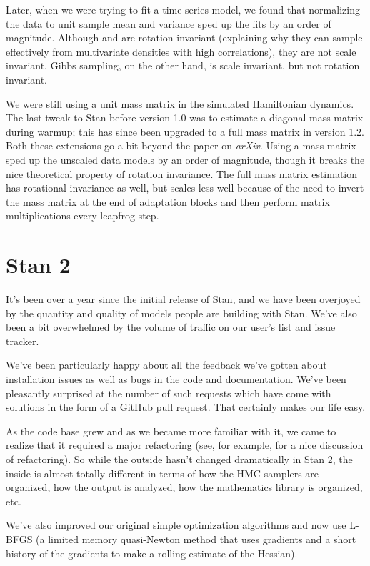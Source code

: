 Later, when we were trying to fit a time-series model, we found that
normalizing the data to unit sample mean and variance sped up the fits
by an order of magnitude.  Although \HMC and \NUTS are rotation
invariant (explaining why they can sample effectively from
multivariate densities with high correlations), they are not scale
invariant.  Gibbs sampling, on the other hand, is scale invariant, but
not rotation invariant.

We were still using a unit mass matrix in the simulated Hamiltonian
dynamics.  The last tweak to Stan before version 1.0 was to estimate
a diagonal mass matrix during warmup; this has since been upgraded to
a full mass matrix in version 1.2.  Both these extensions go a bit
beyond the \NUTS paper on {\it arXiv}.  Using a mass matrix sped up
the unscaled data models by an order of magnitude, though it breaks
the nice theoretical property of rotation invariance.  The full mass
matrix estimation has rotational invariance as well, but scales less
well because of the need to invert the mass matrix at the end of
adaptation blocks and then perform matrix multiplications every
leapfrog step.

\section*{Stan 2}

It's been over a year since the initial release of Stan, and we have
been overjoyed by the quantity and quality of models people are
building with Stan.  We've also been a bit overwhelmed by the volume
of traffic on our user's list and issue tracker.

We've been particularly happy about all the feedback we've gotten
about installation issues as well as bugs in the code and
documentation.  We've been pleasantly surprised at the number of such
requests which have come with solutions in the form of a GitHub pull
request.  That certainly makes our life easy.

As the code base grew and as we became more familiar with it, we came
to realize that it required a major refactoring (see, for example,
\citep{FowlerEtAl:1999} for a nice discussion of refactoring).  So
while the outside hasn't changed dramatically in Stan 2, the inside is
almost totally different in terms of how the HMC samplers are
organized, how the output is analyzed, how the mathematics library is
organized, etc.

We've also improved our original simple optimization algorithms and
now use L-BFGS (a limited memory quasi-Newton method that uses
gradients and a short history of the gradients to make a rolling
estimate of the Hessian).

